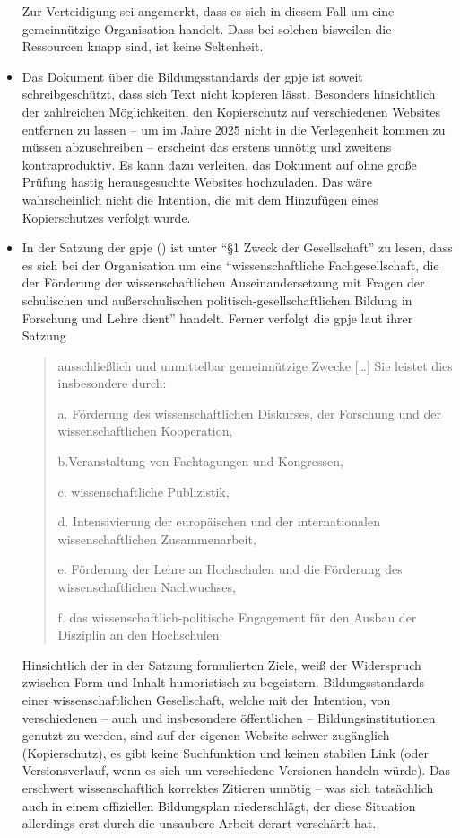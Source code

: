 \begin{itemize}
    Zur Verteidigung sei angemerkt, dass es sich in diesem Fall um eine gemeinnützige Organisation handelt. Dass bei solchen bisweilen die Ressourcen knapp sind, ist keine Seltenheit.  
    
    \item Das Dokument über die Bildungsstandards der \gls{gpje} ist soweit schreibgeschützt, dass sich Text nicht kopieren lässt. Besonders hinsichtlich der zahlreichen Möglichkeiten, den Kopierschutz auf verschiedenen Websites entfernen zu lassen -- um im Jahre 2025 nicht in die Verlegenheit kommen zu müssen abzuschreiben -- erscheint das erstens unnötig und zweitens kontraproduktiv. Es kann dazu verleiten, das Dokument auf ohne große Prüfung hastig herausgesuchte Websites hochzuladen. Das wäre wahrscheinlich nicht die Intention, die mit dem Hinzufügen eines Kopierschutzes verfolgt wurde. 
    
    \item In der Satzung der \gls{gpje} (\citeyear[]{gpje.satzung}) ist unter \enquote{\S 1 Zweck der Gesellschaft} zu lesen, dass es sich bei der Organisation um eine \enquote{wissenschaftliche Fachgesellschaft, die der Förderung der wissenschaftlichen Auseinandersetzung mit Fragen der schulischen und außerschulischen politisch-gesellschaftlichen Bildung in Forschung und Lehre dient} handelt.
    Ferner verfolgt die \gls{gpje} laut ihrer Satzung \blockquote{ausschließlich und unmittelbar gemeinnützige Zwecke [\dots] Sie leistet dies insbesondere durch:
    
    a. Förderung des wissenschaftlichen Diskurses, der Forschung und der wissenschaftlichen Kooperation,
    
    b.Veranstaltung von Fachtagungen und Kongressen,
    
    c. wissenschaftliche Publizistik,
    
    d. Intensivierung der europäischen und der internationalen wissenschaftlichen Zusammenarbeit,
    
    e. Förderung der Lehre an Hochschulen und die Förderung des wissenschaftlichen Nachwuchses,
    
    f. das wissenschaftlich-politische Engagement für den Ausbau der Disziplin an den Hochschulen.}

    Hinsichtlich der in der Satzung formulierten Ziele, weiß der Widerspruch zwischen Form und Inhalt humoristisch zu begeistern. Bildungsstandards einer wissenschaftlichen Gesellschaft, welche mit der Intention, von verschiedenen -- auch und insbesondere öffentlichen -- Bildungsinstitutionen genutzt zu werden, sind auf der eigenen Website schwer zugänglich (Kopierschutz), es gibt keine Suchfunktion und keinen stabilen Link (oder Versionsverlauf, wenn es sich um verschiedene Versionen handeln würde). Das erschwert wissenschaftlich korrektes Zitieren unnötig -- was sich tatsächlich auch in einem offiziellen Bildungsplan \autocite[][9]{bplan} niederschlägt, der diese Situation allerdings erst durch die unsaubere Arbeit derart verschärft hat. 
    

\end{itemize}
